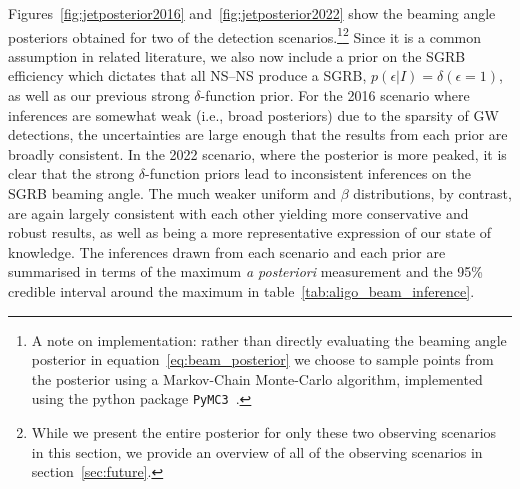 \documentclass[twocolumn,nofootinbib]{revtex4-1}
\newcommand{\BNS}{\ac{NS}--\ac{NS}\xspace}
\begin{document}
Figures~\ref{fig:jetposterior2016} and~\ref{fig:jetposterior2022} show
the beaming angle posteriors obtained for two of the detection
scenarios.\footnote{
    A note on implementation: rather than directly evaluating
    the beaming angle posterior in equation~\ref{eq:beam_posterior} we
    choose to sample points from the posterior using a Markov-Chain
    Monte-Carlo algorithm, implemented using the python package
    \texttt{PyMC3}~\cite{salvatier2016probabilistic}.
}\footnote{
    While we present the entire posterior for only these two
    observing scenarios in this section, we provide an overview of all
    of the observing scenarios in section~\ref{sec:future}.}
Since it is a common assumption in related literature, we also now include
a prior on the \ac{SGRB} efficiency which dictates that all \BNS produce a
\ac{SGRB}, $p(\epsilon|I)=\delta(\epsilon=1)$, as well as our previous
strong $\delta$-function prior.  For the 2016 scenario where
inferences are somewhat weak (i.e., broad posteriors) due to the
sparsity of \ac{GW} detections, the uncertainties are large enough
that the results from each prior are broadly consistent.  In the 2022
scenario, where the posterior is more peaked, it is clear that the
strong $\delta$-function priors lead to inconsistent inferences on the
\ac{SGRB} beaming angle.  The much weaker uniform and $\beta$
distributions, by contrast, are again largely consistent with each
other yielding more conservative and robust results, as well as being
a more representative expression of our state of knowledge.  The
inferences drawn from each scenario and each prior are summarised in
terms of the maximum \emph{a posteriori} measurement and the 95\%
credible interval around the maximum in
table~\ref{tab:aligo_beam_inference}.
\end{document}
